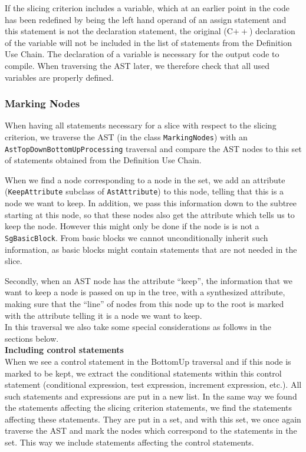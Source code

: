\documentclass[11pt,a4paper,twoside]{article}
\begin{document}
If the slicing criterion includes a variable, which at an earlier point in the code has been redefined by being the left hand operand of an assign statement and this statement is not the declaration statement, the original (C$++$) declaration of the variable will not be included in the list of statements from the Definition Use Chain. The declaration of a variable is necessary for the output code to compile. When traversing the AST later, we therefore check that all used variables are properly defined.

\subsubsection{Marking Nodes}
When having all statements necessary for a slice with respect to the slicing criterion, we traverse the AST (in the class \texttt{MarkingNodes}) with an \texttt{AstTop\-Down\-Bottom\-Up\-Processing} traversal and compare the AST nodes to this set of statements obtained from the Definition Use Chain.

When we find a node corresponding to a node in the set, we add an attribute (\texttt{KeepAttribute} subclass of \texttt{AstAttribute}) to this node, telling that this is a node we want to keep. In addition, we pass this information down to the subtree starting at this node, so that these nodes also get the attribute which tells us to keep the node. However this might only be done if the node is is not a \texttt{SgBasicBlock}. From basic blocks we cannot unconditionally inherit such information, as basic blocks might contain statements that are not needed in the slice.

Secondly, when an AST node has the attribute ``keep'', the information that we want to keep a node is passed on up in the tree, with a synthesized attribute, making sure that the ``line'' of nodes from this node up to the root is marked with the attribute telling it is a node we want to keep.\\

In this traversal we also take some special considerations as follows in the sections below.\\

\noindent
\textbf{Including control statements}\\
When we see a control statement in the BottomUp traversal and if this node is marked to be kept, we extract the conditional statements within this control statement (conditional expression, test expression, increment expression, etc.). All such statements and expressions are put in a new list. In the same way we found the statements affecting the slicing criterion statements, we find the statements affecting these statements. They are put in a set, and with this set, we once again traverse the AST and mark the nodes which correspond to the statements in the set. This way we include statements affecting the control statements.\\
\end{document}
